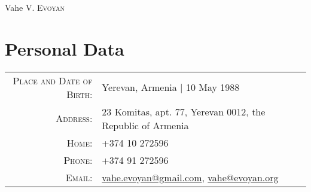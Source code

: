 \documentclass[a4paper,10pt]{article}
\begin{document}
\pagestyle{empty} %

\par{\centering
    {\Huge Vahe V. \textsc{Evoyan}
  }\bigskip\par}

\section{Personal Data}
\begin{tabular}{rl}
    \textsc{Place and Date of Birth:} & Yerevan, Armenia | 10 May 1988 \\
    \textsc{Address:}                 & 23 Komitas, apt. 77, Yerevan 0012, the
                                        Republic of Armenia \\
    \textsc{Home:}                    & +374 10 272596\\
    \textsc{Phone:}                   & +374 91 272596\\
    \textsc{Email:}                   & \href{mailto:vahe.evoyan@gmail.com}
                                             {vahe.evoyan@gmail.com},
                                        \href{mailto:vahe@evoyan.org}
                                             {vahe@evoyan.org}
\end{tabular}


\end{document}

